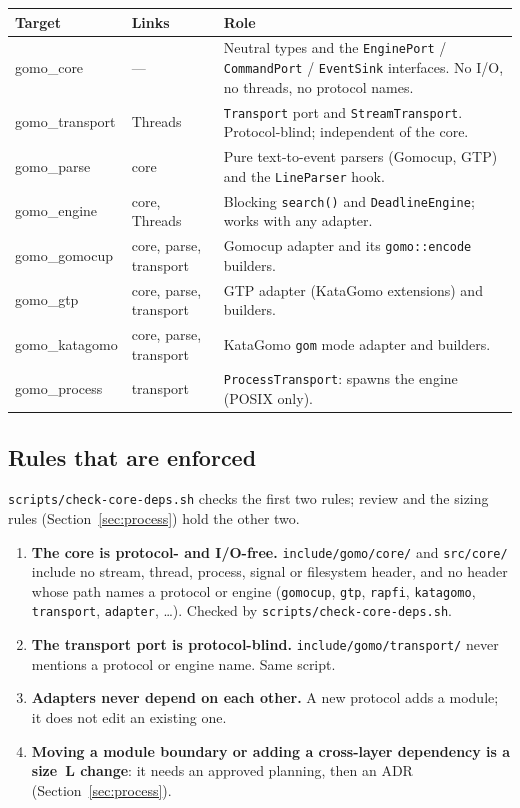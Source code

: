 \documentclass[11pt,a4paper]{article}
\newcommand{\code}[1]{\texttt{#1}}
\newcommand{\file}[1]{\texttt{#1}}
\begin{document}
\begin{center}
\small
\begin{tabularx}{\textwidth}{@{}>{\ttfamily}l >{\ttfamily}l X@{}}
\toprule
\normalfont\textbf{Target} & \normalfont\textbf{Links} & \textbf{Role} \\
\midrule
gomo\_core      & --- & Neutral types and the \code{EnginePort} / \code{CommandPort} /
                          \code{EventSink} interfaces. No I/O, no threads, no protocol names. \\
gomo\_transport & Threads & \code{Transport} port and \code{StreamTransport}. Protocol-blind;
                          independent of the core. \\
gomo\_parse     & core & Pure text-to-event parsers (Gomocup, GTP) and the \code{LineParser} hook. \\
gomo\_engine    & core, Threads & Blocking \code{search()} and \code{DeadlineEngine}; works
                          with any adapter. \\
gomo\_gomocup   & core, parse, transport & Gomocup adapter and its \code{gomo::encode} builders. \\
gomo\_gtp       & core, parse, transport & GTP adapter (KataGomo extensions) and builders. \\
gomo\_katagomo  & core, parse, transport & KataGomo \code{gom} mode adapter and builders. \\
gomo\_process   & transport & \code{ProcessTransport}: spawns the engine (POSIX only). \\
\bottomrule
\end{tabularx}
\end{center}

\subsection{Rules that are enforced}

\file{scripts/check-core-deps.sh} checks the first two rules; review and the sizing rules
(Section~\ref{sec:process}) hold the other two.

\begin{enumerate}
  \item \textbf{The core is protocol- and I/O-free.} \file{include/gomo/core/} and
        \file{src/core/} include no stream, thread, process, signal or filesystem header, and no
        header whose path names a protocol or engine (\code{gomocup}, \code{gtp}, \code{rapfi},
        \code{katagomo}, \code{transport}, \code{adapter}, \ldots). Checked by
        \file{scripts/check-core-deps.sh}.
  \item \textbf{The transport port is protocol-blind.} \file{include/gomo/transport/} never
        mentions a protocol or engine name. Same script.
  \item \textbf{Adapters never depend on each other.} A new protocol adds a module; it does not edit
        an existing one.
  \item \textbf{Moving a module boundary or adding a cross-layer dependency is a size~L change}: it
        needs an approved planning, then an ADR (Section~\ref{sec:process}).
\end{enumerate}
\end{document}
